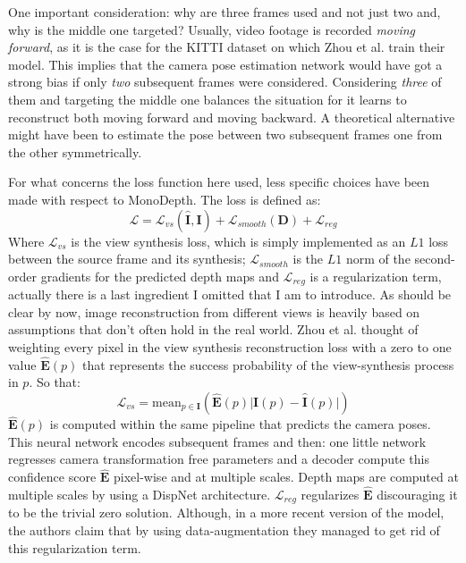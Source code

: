One important consideration: why are three frames used and not just two and, why is the middle one targeted?
Usually, video footage is recorded \textit{moving forward}, as it is the case for the KITTI dataset on which Zhou et al. train their model.
This implies that the camera pose estimation network would have got a strong bias if only \textit{two} subsequent frames were considered.
Considering \textit{three} of them and targeting the middle one balances the situation for it learns to reconstruct both moving forward and moving backward.
A theoretical alternative might have been to estimate the pose between two subsequent frames one from the other symmetrically.

For what concerns the loss function here used, less specific choices have been made with respect to MonoDepth.
The loss is defined as:
\[
	\mathcal{L} = \mathcal{L}_{vs}(\hat{\mathbf{I}}, \mathbf{I}) + \mathcal{L}_{smooth}(\mathbf{D}) + \mathcal{L}_{reg}
\]
Where $\mathcal{L}_{vs}$ is the view synthesis loss, which is simply implemented as an $L1$ loss between the source frame and its synthesis; $\mathcal{L}_{smooth}$ is the $L1$ norm of the second-order gradients for the predicted depth maps and $\mathcal{L}_{reg}$ is a regularization term, actually there is a last ingredient I omitted that I am to introduce.
As should be clear by now, image reconstruction from different views is heavily based on assumptions that don't often hold in the real world.
Zhou et al. thought of weighting every pixel in the view synthesis reconstruction loss with a zero to one value $\hat{\mathbf{E}}(p)$ that represents the success probability of the view-synthesis process in $p$.
So that:
\[
	\mathcal{L}_{vs} = \text{mean}_{p \in \mathbf{I}}
		\left(
			\hat{\mathbf{E}}(p) \big| \mathbf{I}(p) - \hat{\mathbf{I}}(p) \big|
		\right)
\]
$\hat{\mathbf{E}}(p)$ is computed within the same pipeline that predicts the camera poses.
This neural network encodes subsequent frames and then: one little network regresses camera transformation free parameters and a decoder compute this confidence score $\hat{\mathbf{E}}$ pixel-wise and at multiple scales.
Depth maps are computed at multiple scales by using a DispNet \cite{DispNet} architecture.
$\mathcal{L}_{reg}$ regularizes $\hat{\mathbf{E}}$ discouraging it to be the trivial zero solution.
Although, in a more recent version of the model, the authors claim that by using data-augmentation they managed to get rid of this regularization term.

